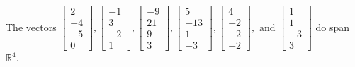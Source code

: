 \begin{exercise}
\begin{exerciseStatement}
  \end{exerciseStatement}
  \begin{exerciseAnswer}
   The vectors \(\left[\begin{array}{r}
2 \\
-4 \\
-5 \\
0
\end{array}\right] , \left[\begin{array}{r}
-1 \\
3 \\
-2 \\
1
\end{array}\right] , \left[\begin{array}{r}
-9 \\
21 \\
9 \\
3
\end{array}\right] , \left[\begin{array}{r}
5 \\
-13 \\
1 \\
-3
\end{array}\right] , \left[\begin{array}{r}
4 \\
-2 \\
-2 \\
-2
\end{array}\right] , \text{ and } \left[\begin{array}{r}
1 \\
1 \\
-3 \\
3
\end{array}\right]\) 
  	 do  
	span \(\mathbb{R}^4\).
  


  \end{exerciseAnswer}
\end{exercise}